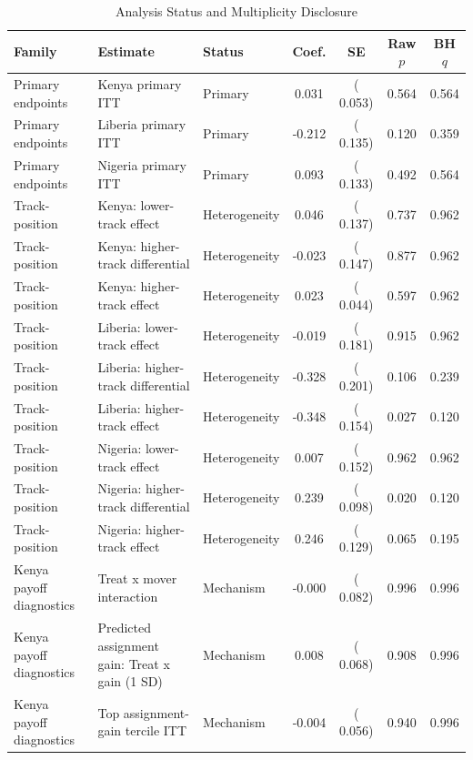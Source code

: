 \begin{table}[!htbp]
\centering
\caption{Analysis Status and Multiplicity Disclosure}
\label{tab:multiplicity_disclosure}
\begin{threeparttable}
\scriptsize
\setlength{\tabcolsep}{3pt}
\begin{tabular}[t]{p{3.1cm}p{4.8cm}p{1.8cm}cccc}
\toprule
Family & Estimate & Status & Coef. & SE & Raw $p$ & BH $q$ \\
\midrule
Primary endpoints & Kenya primary ITT & Primary &   0.031 & (  0.053) & 0.564 & 0.564 \\
Primary endpoints & Liberia primary ITT & Primary &  -0.212 & (  0.135) & 0.120 & 0.359 \\
Primary endpoints & Nigeria primary ITT & Primary &   0.093 & (  0.133) & 0.492 & 0.564 \\
\addlinespace
Track-position & Kenya: lower-track effect & Heterogeneity &   0.046 & (  0.137) & 0.737 & 0.962 \\
Track-position & Kenya: higher-track differential & Heterogeneity &  -0.023 & (  0.147) & 0.877 & 0.962 \\
Track-position & Kenya: higher-track effect & Heterogeneity &   0.023 & (  0.044) & 0.597 & 0.962 \\
Track-position & Liberia: lower-track effect & Heterogeneity &  -0.019 & (  0.181) & 0.915 & 0.962 \\
Track-position & Liberia: higher-track differential & Heterogeneity &  -0.328 & (  0.201) & 0.106 & 0.239 \\
Track-position & Liberia: higher-track effect & Heterogeneity &  -0.348 & (  0.154) & 0.027 & 0.120 \\
Track-position & Nigeria: lower-track effect & Heterogeneity &   0.007 & (  0.152) & 0.962 & 0.962 \\
Track-position & Nigeria: higher-track differential & Heterogeneity &   0.239 & (  0.098) & 0.020 & 0.120 \\
Track-position & Nigeria: higher-track effect & Heterogeneity &   0.246 & (  0.129) & 0.065 & 0.195 \\
\addlinespace
Kenya payoff diagnostics & Treat x mover interaction & Mechanism &  -0.000 & (  0.082) & 0.996 & 0.996 \\
Kenya payoff diagnostics & Predicted assignment gain: Treat x gain (1 SD) & Mechanism &   0.008 & (  0.068) & 0.908 & 0.996 \\
Kenya payoff diagnostics & Top assignment-gain tercile ITT & Mechanism &  -0.004 & (  0.056) & 0.940 & 0.996 \\

\end{tabular}
\end{threeparttable}
\end{table}
